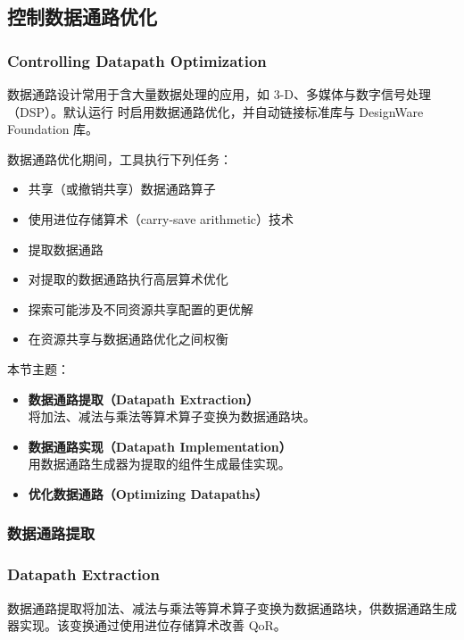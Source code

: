 \subsection{控制数据通路优化}
\subsubsection*{Controlling Datapath Optimization}

数据通路设计常用于含大量数据处理的应用，如 3-D、多媒体与数字信号处理（DSP）。默认运行  时启用数据通路优化，并自动链接标准库与 DesignWare Foundation 库。

数据通路优化期间，工具执行下列任务：
\begin{itemize}
  \item 共享（或撤销共享）数据通路算子
  \item 使用进位存储算术（carry-save arithmetic）技术
  \item 提取数据通路
  \item 对提取的数据通路执行高层算术优化
  \item 探索可能涉及不同资源共享配置的更优解
  \item 在资源共享与数据通路优化之间权衡
\end{itemize}

本节主题：
\begin{itemize}
  \item \textbf{数据通路提取（Datapath Extraction）}\\
    将加法、减法与乘法等算术算子变换为数据通路块。
  \item \textbf{数据通路实现（Datapath Implementation）}\\
    用数据通路生成器为提取的组件生成最佳实现。
  \item \textbf{优化数据通路（Optimizing Datapaths）}
\end{itemize}

\subsubsection{数据通路提取}
\subsubsection*{Datapath Extraction}

数据通路提取将加法、减法与乘法等算术算子变换为数据通路块，供数据通路生成器实现。该变换通过使用进位存储算术改善 QoR。

